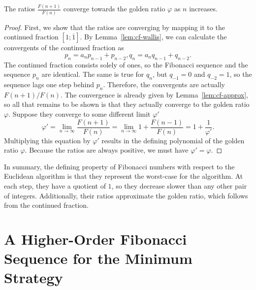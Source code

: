 \begin{theorem}
  The ratios $\frac{F(n+1)}{F(n)}$ converge towards the golden ratio $φ$ as $n$ increases.
\end{theorem}

\begin{proof}
  First, we show that the ratios are converging by mapping it to the continued fraction $[1; \overline{1}]$.
  By Lemma~\ref{lem:cf-wallis}, we can calculate the convergents of the continued fraction as
  \[
    p_n = a_n p_{n-1} + p_{n-2}, q_n = a_n q_{n-1} + q_{n-2}.
  \]
  The continued fraction consists solely of ones,
  so the Fibonacci sequence and the sequence $p_n$ are identical.
  The same is true for $q_n$, but $q_{-1} = 0$ and $q_{-2} = 1$, so the sequence lags one step behind $p_n$.
  Therefore, the convergents are actually $F(n+1)/F(n)$.
  The convergence is already given by Lemma~\vref{lem:cf-approx},
  so all that remains to be shown is that they actually converge to the golden ratio $φ$.
  Suppose they converge to some different limit $φ'$
  \[
    φ' = \lim_{n → ∞} \frac{F(n+1)}{F(n)} = \lim_{n → ∞} 1 + \frac{F(n-1)}{F(n)} = 1 + \frac{1}{φ'}.
  \]
  Multiplying this equation by $φ'$ results in the defining polynomial of the golden ratio $φ$.
  Because the ratios are always positive, we must have $φ' = φ$.
\end{proof}


In summary,
the defining property of Fibonacci numbers with respect to the Euclidean
algorithm is that they represent the worst-case for the algorithm.
At each step, they have a quotient of $1$, so they decrease slower than any other pair of integers.
Additionally, their ratios approximate the golden ratio,
which follows from the continued fraction.

\section{A Higher-Order Fibonacci Sequence for the Minimum Strategy}


